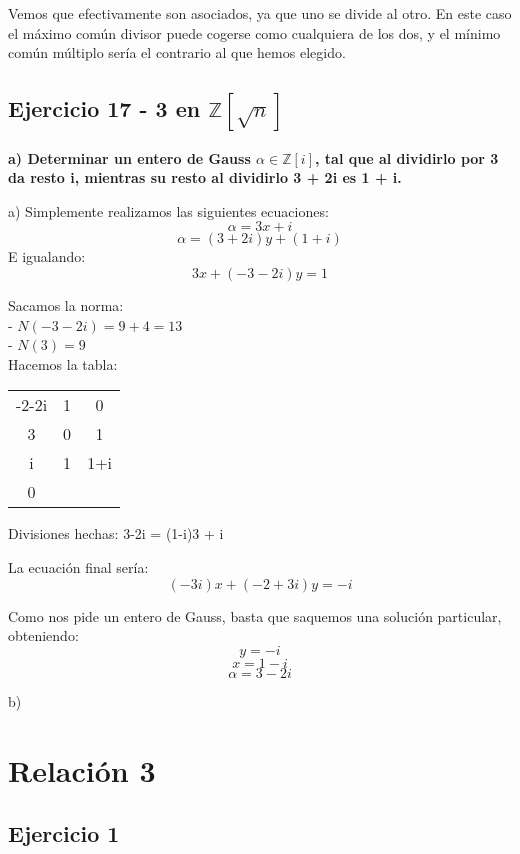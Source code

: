 \documentclass[11pt, a4paper, titlepage]{article}
\providecommand{\ent}{\mathbb{Z}}
\begin{document}
Vemos que efectivamente son asociados, ya que uno se divide al otro. En este caso el máximo común divisor puede cogerse como
cualquiera de los dos, y el mínimo común múltiplo sería el contrario al que hemos elegido.

\subsection{\LARGE{Ejercicio 17 - 3 en $\ent [\sqrt{n}]$}}

\textbf{a) Determinar un entero de Gauss $\alpha \in \ent [i]$, tal que al dividirlo por 3 da resto i, mientras su resto al dividirlo 3 + 2i es 1 + i.}



a) Simplemente realizamos las siguientes ecuaciones:
$$ \alpha = 3x + i $$
$$ \alpha = (3+2i)y + (1+i) $$
E igualando:
$$ 3x + (-3-2i)y = 1 $$

Sacamos la norma: \\
- $N(-3-2i) = 9 + 4 = 13 $ \\
- $N(3) = 9 $ \\

Hacemos la tabla:

\begin{center}
\begin{tabular}{c|cc}
-2-2i & 1 & 0 \\
3 & 0 & 1 \\
\hline
i & 1 & 1+i \\
\hline
0
\end{tabular}
\end{center}

Divisiones hechas: 3-2i = (1-i)3 + i

La ecuación final sería:
$$ (-3i)x + (-2+3i)y = -i $$

Como nos pide un entero de Gauss, basta que saquemos una solución particular, obteniendo:
$$ y = -i $$
$$ x = 1 -i $$
$$ \alpha = 3-2i $$

b)




\pagebreak
\section{\Huge{Relación 3}}

\subsection{\LARGE{Ejercicio 1}}
\end{document}
